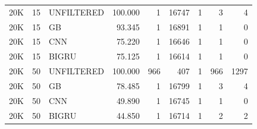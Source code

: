 \begin{landscape}
\begin{table}[htbp]
\begin{tabular}{lrlrrrrrr}
20K & 15 & UNFILTERED & 100.000 & 1 & 16747 & 1 & 3 & 4 \\
20K & 15 & GB         & 93.345  & 1 & 16891 & 1 & 1 & 0 \\
20K & 15 & CNN        & 75.220  & 1 & 16646 & 1 & 1 & 0 \\
20K & 15 & BIGRU      & 75.125  & 1 & 16614 & 1 & 1 & 0 \\

20K & 50 & UNFILTERED & 100.000 & 966 & 407 & 1 & 966 & 1297 \\
20K & 50 & GB         & 78.485  & 1 & 16799 & 1 & 3 & 4 \\
20K & 50 & CNN        & 49.890  & 1 & 16745 & 1 & 1 & 0 \\
20K & 50 & BIGRU      & 44.850  & 1 & 16714 & 1 & 2 & 2 \\
\bottomrule
\end{tabular}
\end{table}
\end{landscape}